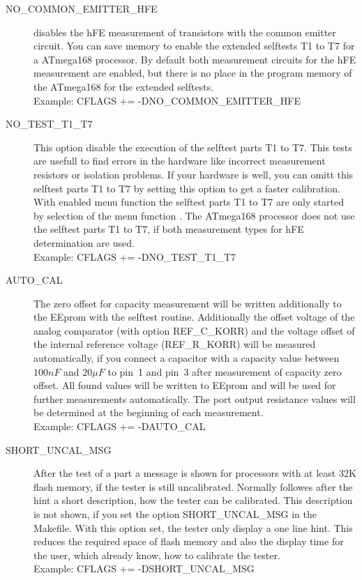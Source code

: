 \begin{description}
  \item[NO\_COMMON\_EMITTER\_HFE] disables the hFE measurement of transistors with the common emitter circuit.
You can save memory to enable the extended selftests T1 to T7 for a ATmega168 processor.
By default both measurement circuits for the hFE measurement are enabled, 
but there is no place in the program memory of the ATmega168 for the extended selftests.\\
Example: CFLAGS += -DNO\_COMMON\_EMITTER\_HFE

  \item[NO\_TEST\_T1\_T7] This option disable the execution of the selftest parts T1 to T7.
This tests are usefull to find errors in the hardware like incorrect measurement resistors or isolation problems.
If your hardware is well, you can omitt this selftest parts T1 to T7 by setting this option to get a faster calibration.
With enabled menu function the selftest parts T1 to T7 are only started by selection of the menu function .
The ATmega168 processor does not use the selftest parts T1 to T7, if both measurement types for hFE determination are used.\\
Example: CFLAGS += -DNO\_TEST\_T1\_T7

  \item[AUTO\_CAL] The zero offset for capacity measurement will be written additionally
to the EEprom with the selftest routine. Additionally the offset voltage of the analog comparator (with option REF\_C\_KORR) and the
voltage offset of the internal reference voltage (REF\_R\_KORR) will be measured automatically, if you connect a
capacitor with a capacity value between \(100nF\) and \(20\mu F\) to pin~1 and pin~3 after measurement of capacity zero offset. 
All found values will be written to EEprom and will be used for further measurements automatically.
The port output resistance values will be determined at the beginning of each measurement.\\
Example: CFLAGS += -DAUTO\_CAL

  \item[SHORT\_UNCAL\_MSG] After the test of a part a message is shown for processors with at least 32K flash memory,
if the tester is still uncalibrated. Normally followes after the hint a short description, how the
tester can be calibrated. This description is not shown, if you set the option SHORT\_UNCAL\_MSG in the Makefile.
With this option set, the tester only display a one line hint.
This reduces the required space of flash memory  and also the display time for the user,
which already know, how to calibrate the tester.\\
Example: CFLAGS += -DSHORT\_UNCAL\_MSG


\end{description}
